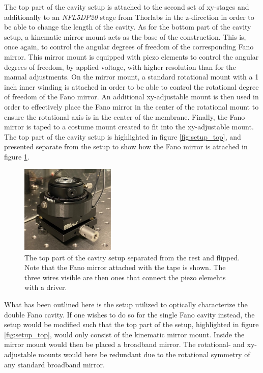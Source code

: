 The top part of the cavity setup is attached to the second set of xy-stages and additionally to an \emph{NFL5DP20} stage from Thorlabs in the z-direction in order to be able to change the length of the cavity. As for the bottom part of the cavity setup, a kinematic mirror mount acts as the base of the construction. This is, once again, to control the angular degrees of freedom of the corresponding Fano mirror. This mirror mount is equipped with piezo elements to control the angular degrees of freedom, by applied voltage, with higher resolution than for the manual adjustments. On the mirror mount, a standard rotational mount with a 1 inch inner winding is attached in order to be able to control the rotational degree of freedom of the Fano mirror. An additional xy-adjustable mount is then used in order to effectively place the Fano mirror in the center of the rotational mount to ensure the rotational axis is in the center of the membrane. Finally, the Fano mirror is taped to a costume mount created to fit into the xy-adjustable mount. The top part of the cavity setup is highlighted in figure \ref{fig:setup_top}, and presented separate from the setup to show how the Fano mirror is attached in figure \ref{fig:cavity_setup_top_separate_pic}.

\begin{figure}[h!]
    \centering
    \includegraphics[width=0.4\textwidth]{figures/cavity_setup_top_separate_pic.pdf}
    \caption{The top part of the cavity setup separated from the rest and flipped. Note that the Fano mirror attached with the tape is shown. The three wires visible are then ones that connect the piezo elemehts with a driver.}
    \label{fig:cavity_setup_top_separate_pic}    
\end{figure}

What has been outlined here is the setup utilized to optically characterize the double Fano cavity. If one wishes to do so for the single Fano cavity instead, the setup would be modified such that the top part of the setup, highlighted in figure \ref{fig:setup_top}, would only consist of the kinematic mirror mount. Inside the mirror mount would then be placed a broadband mirror. The rotational- and xy-adjustable mounts would here be redundant due to the rotational symmetry of any standard broadband mirror.

